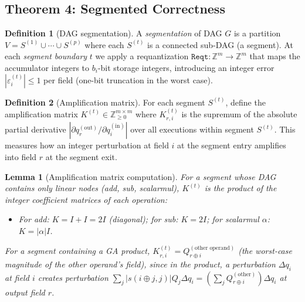 \documentclass[11pt,a4paper]{article}
\theoremstyle{definition}
\newtheorem{definition}{Definition}[section]
\theoremstyle{plain}
\newtheorem{lemma}{Lemma}[section]
\theoremstyle{remark}
\begin{document}
\subsection{Theorem 4: Segmented Correctness}
\label{sec:segmented}

\begin{definition}[DAG segmentation]
A \emph{segmentation} of DAG $G$ is a partition $V = S^{(1)} \cup \cdots \cup S^{(p)}$ where each $S^{(t)}$ is a connected sub-DAG (a segment).  At each \emph{segment boundary} $t$ we apply a requantization $\mathtt{Reqt}: \mathbb{Z}^m \to \mathbb{Z}^m$ that maps the accumulator integers to $b_i$-bit storage integers, introducing an integer error $|\varepsilon_i^{(t)}| \le 1$ per field (one-bit truncation in the worst case).
\end{definition}

\begin{definition}[Amplification matrix]
For each segment $S^{(t)}$, define the amplification matrix $K^{(t)} \in \mathbb{Z}_{\ge 0}^{m\times m}$ where $K^{(t)}_{r,i}$ is the supremum of the absolute partial derivative $|\partial q_r^{(\mathrm{out})}/\partial q_i^{(\mathrm{in})}|$ over all executions within segment $S^{(t)}$.  This measures how an integer perturbation at field $i$ at the segment entry amplifies into field $r$ at the segment exit.
\end{definition}

\begin{lemma}[Amplification matrix computation]
\label{lem:amp}
For a segment whose DAG contains only linear nodes (add, sub, scalarmul), $K^{(t)}$ is the product of the integer coefficient matrices of each operation:
\begin{itemize}
  \item For add: $K = I + I = 2I$ (diagonal); for sub: $K = 2I$; for scalarmul $\alpha$: $K = |\alpha| I$.
\end{itemize}
For a segment containing a GA product, $K^{(t)}_{r,i} = Q_{r\oplus i}^{(\text{other operand})}$ (the worst-case magnitude of the other operand's field), since in the product, a perturbation $\Delta q_i$ at field $i$ creates perturbation $\sum_j |s(i\oplus j,j)| Q_j \Delta q_i = (\sum_j Q_{r\oplus i}^{(\mathrm{other})}) \Delta q_i$ at output field $r$.
\end{lemma}
\end{document}
